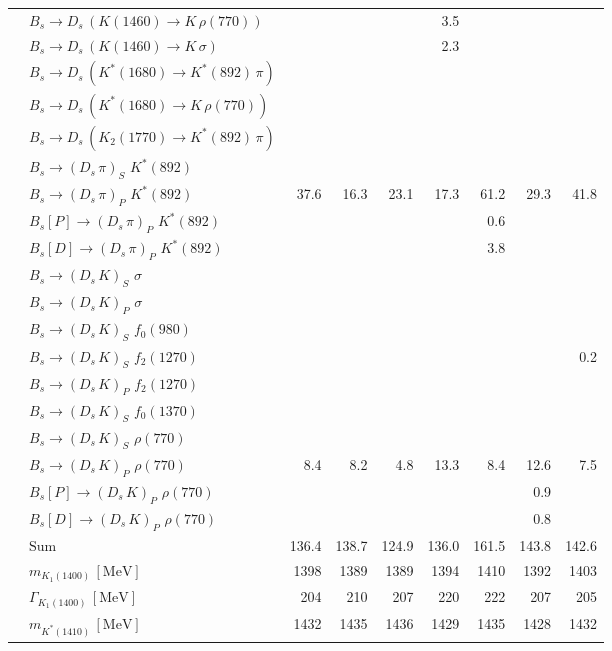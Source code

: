 \begin{tabular}{l l  r  r  r  r  r  r  r  }
 & $B_s \to D_s \, ( K(1460) \to K \, \rho(770) )$ &  &  &  & 3.5 &  &  &  \\ 
 & $B_s \to D_s \, ( K(1460) \to K \, \sigma )$ &  &  &  & 2.3 &  &  &  \\ 
 & $B_s \to D_s \, ( K^{*}(1680) \to K^{*}(892) \, \pi )$ &  &  &  &  &  &  &  \\ 
 & $B_s \to D_s \, ( K^{*}(1680) \to K \, \rho(770) )$ &  &  &  &  &  &  &  \\ 
 & $B_s \to D_s \, ( K_2(1770) \to K^{*}(892) \, \pi )$ &  &  &  &  &  &  &  \\ 
 & $B_s \to ( D_s \, \pi)_{S} \, \, K^{*}(892)$ &  &  &  &  &  &  &  \\ 
 & $B_s \to ( D_s \, \pi)_{P} \, \, K^{*}(892)$ & 37.6 & 16.3 & 23.1 & 17.3 & 61.2 & 29.3 & 41.8 \\ 
 & $B_s[P] \to ( D_s \, \pi)_{P} \, \, K^{*}(892)$ &  &  &  &  & 0.6 &  &  \\ 
 & $B_s[D] \to ( D_s \, \pi)_{P} \, \, K^{*}(892)$ &  &  &  &  & 3.8 &  &  \\ 
 & $B_s \to ( D_s \, K)_{S} \, \, \sigma$ &  &  &  &  &  &  &  \\ 
 & $B_s \to ( D_s \, K)_{P} \, \, \sigma$ &  &  &  &  &  &  &  \\ 
 & $B_s \to ( D_s \, K)_{S} \, \, f_0(980)$ &  &  &  &  &  &  &  \\ 
 & $B_s \to ( D_s \, K)_{S} \, \, f_2(1270)$ &  &  &  &  &  &  & 0.2 \\ 
 & $B_s \to ( D_s \, K)_{P} \, \, f_2(1270)$ &  &  &  &  &  &  &  \\ 
 & $B_s \to ( D_s \, K)_{S} \, \, f_0(1370)$ &  &  &  &  &  &  &  \\ 
 & $B_s \to ( D_s \, K)_{S} \, \, \rho(770)$ &  &  &  &  &  &  &  \\ 
 & $B_s \to ( D_s \, K)_{P} \, \, \rho(770)$ & 8.4 & 8.2 & 4.8 & 13.3 & 8.4 & 12.6 & 7.5 \\ 
 & $B_s[P] \to ( D_s \, K)_{P} \, \, \rho(770)$ &  &  &  &  &  & 0.9 &  \\ 
 & $B_s[D] \to ( D_s \, K)_{P} \, \, \rho(770)$ &  &  &  &  &  & 0.8 &  \\ 
 & $\text{Sum}$ & 136.4 & 138.7 & 124.9 & 136.0 & 161.5 & 143.8 & 142.6 \\ 
\hline
 & $m_{K_1(1400)} \, [\text{MeV}]$ & 1398 & 1389 & 1389 & 1394 & 1410 & 1392 & 1403 \\ 
 & $\Gamma_{K_1(1400)} \, [\text{MeV}]$ & 204 & 210 & 207 & 220 & 222 & 207 & 205 \\ 
 & $m_{K^{*}(1410)} \, [\text{MeV}]$ & 1432 & 1435 & 1436 & 1429 & 1435 & 1428 & 1432 \\ 

\end{tabular}
